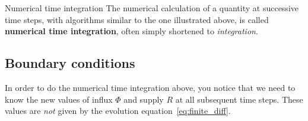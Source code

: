\documentclass[a4paper,12pt,%
onecolumn,oneside,titlepage,%
british%
]{memoir}
\renewcommand*{\|}[1][]{\nonscript\:#1\vert\nonscript\:\mathopen{}}
\newcommand*{\yH}{\varPhi}%
\newcommand*{\yR}{R}%
\begin{document}
\begin{definition}{Numerical time integration}
  The numerical calculation of a quantity at successive time steps, with algorithms similar to the one illustrated above, is called \textbf{numerical time integration}, often simply shortened to \emph{integration}.
\end{definition}

\subsection{Boundary conditions}
\label{sec:boundary_conds}

In order to do the numerical time integration above, you notice that we need to know the new values of influx $\yH$ and supply $\yR$ at all subsequent time steps. These values are \emph{not} given by the evolution equation~\eqref{eq:finite_diff}.
\end{document}
